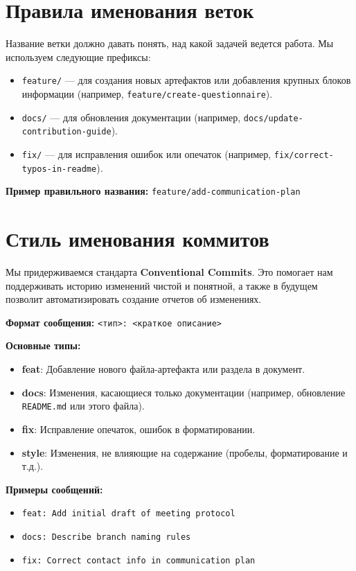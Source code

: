 \documentclass[12pt,a4paper]{article}
\begin{document}
\section{Правила именования веток}

Название ветки должно давать понять, над какой задачей ведется работа. Мы используем следующие префиксы:

\begin{itemize}
    \item \texttt{feature/} — для создания новых артефактов или добавления крупных блоков информации (например, \texttt{feature/create-questionnaire}).
    \item \texttt{docs/} — для обновления документации (например, \texttt{docs/update-contribution-guide}).
    \item \texttt{fix/} — для исправления ошибок или опечаток (например, \texttt{fix/correct-typos-in-readme}).
\end{itemize}

\textbf{Пример правильного названия:} \texttt{feature/add-communication-plan}

\section{Стиль именования коммитов}

Мы придерживаемся стандарта \textbf{Conventional Commits}. Это помогает нам поддерживать историю изменений чистой и понятной, а также в будущем позволит автоматизировать создание отчетов об изменениях.

\textbf{Формат сообщения:} \texttt{<тип>: <краткое описание>}

\textbf{Основные типы:}
\begin{itemize}
    \item \textbf{feat}: Добавление нового файла-артефакта или раздела в документ.
    \item \textbf{docs}: Изменения, касающиеся только документации (например, обновление \texttt{README.md} или этого файла).
    \item \textbf{fix}: Исправление опечаток, ошибок в форматировании.
    \item \textbf{style}: Изменения, не влияющие на содержание (пробелы, форматирование и т.д.).
\end{itemize}

\textbf{Примеры сообщений:}
\begin{itemize}
    \item \texttt{feat: Add initial draft of meeting protocol}
    \item \texttt{docs: Describe branch naming rules}
    \item \texttt{fix: Correct contact info in communication plan}
\end{itemize}
\end{document}

